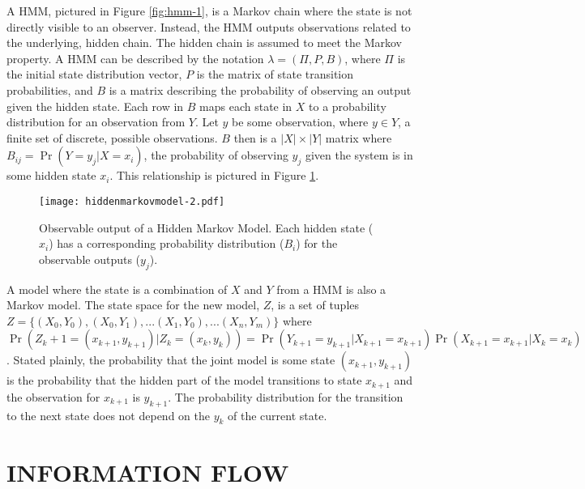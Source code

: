 A \ac{HMM}, pictured in Figure \ref{fig:hmm-1}, is a Markov chain where the state is not directly visible to an observer\cite{hidden-markov}.
Instead, the \ac{HMM} outputs observations related to the underlying, hidden chain.
The hidden chain is assumed to meet the Markov property.
A \ac{HMM} can be described by the notation $\lambda = (\Pi, P, B)$, where $\Pi$ is the initial state distribution vector, $P$ is the matrix of state transition probabilities, and $B$ is a matrix describing the probability of observing an output given the hidden state.
Each row in $B$ maps each state in $X$ to a probability distribution for an observation from $Y$.
Let $y$ be some observation, where $y \in Y$, a finite set of discrete, possible observations.
$B$ then is a $|X|\times|Y|$ matrix where $B_{ij} = \Pr(Y=y_j|X=x_i)$, the probability of observing $y_j$ given the system is in some hidden state $x_i$.
This relationship is pictured in Figure \ref{fig:hmm-2}.

\begin{figure}
	\centering
	\texttt{[image: hiddenmarkovmodel-2.pdf]}
	\caption[Observable output of a hidden Markov model.]{Observable output of a Hidden Markov Model. Each hidden state ($x_i$) has a corresponding probability distribution ($B_i$) for the observable outputs ($y_j$).}
	\label{fig:hmm-2}
\end{figure}

A model where the state is a combination of $X$ and $Y$ from a \ac{HMM} is also a Markov model.
The state space for the new model, $Z$, is a set of tuples $Z = \{(X_0,Y_0), (X_0, Y_1), ... (X_1, Y_0), ... (X_n,Y_m)  \}$ where $\Pr(Z_k+1=(x_{k+1}, y_{k+1})|Z_k=(x_k, y_k)) = \Pr(Y_{k+1}=y_{k+1}|X_{k+1}=x_{k+1})\Pr(X_{k+1}=x_{k+1}|X_{k}=x_k)$.
Stated plainly, the probability that the joint model is some state $(x_{k+1},y_{k+1})$ is the probability that the hidden part of the model transitions to state $x_{k+1}$ and the observation for $x_{k+1}$ is $y_{k+1}$.
The probability distribution for the transition to the next state does not depend on the $y_k$ of the current state.

\section{INFORMATION FLOW}

